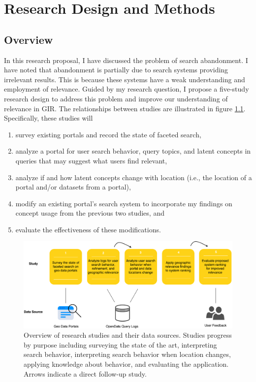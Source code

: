 \chapter{Research Design and Methods} \label{ch:[chapter 5 label]}

\section{Overview}

In this research proposal, I have discussed the problem of search abandonment. I have noted that abandonment is partially due to search systems providing irrelevant results. This is because these systems have a weak understanding and employment of relevance. Guided by my research question, I propose a five-study research design to address this problem and improve our understanding of relevance in GIR. The relationships between studies are illustrated in figure \ref{fig:Methods_Overview}. Specifically, these studies will

\begin{enumerate}
    \item survey existing portals and record the state of faceted  search,
    \item analyze a portal for user search behavior, query topics, and latent concepts in queries that may suggest what users find relevant,
    \item analyze if and how latent concepts change with location (i.e., the location of a portal and/or datasets from a portal),
    \item modify an existing portal's search system to incorporate my findings on concept usage from the previous two studies, and
    \item evaluate the effectiveness of these modifications.
\end{enumerate}

\begin{figure}[H]
    \centering
    \includegraphics[width=1\textwidth]{../figures/Methods_Overview.png}
    \caption{Overview of research studies and their data sources. Studies progress by purpose including surveying the state of the art, interpreting search behavior, interpreting search behavior when location changes, applying knowledge about behavior, and evaluating the application. Arrows indicate a direct follow-up study.}
    \label{fig:Methods_Overview}
\end{figure}

